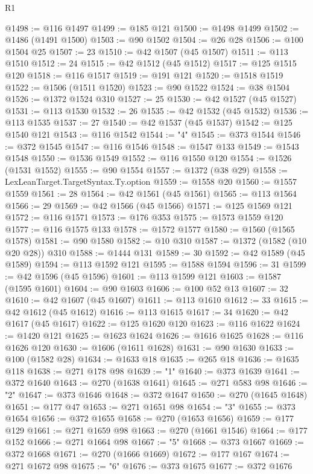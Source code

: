 \begin{lexlean}{R1}
\begin{coremodule}
@1498 := @116 @1497
@1499 := @185 @121
@1500 := @1498 @1499
@1502 := @1486 (@1491 @1500)
@1503 := @90 @1502
@1504 := @26 @28
@1506 := @100 @1504 @25
@1507 := 23
@1510 := @42 @1507 (@45 @1507)
@1511 := @113 @1510
@1512 := 24
@1515 := @42 @1512 (@45 @1512)
@1517 := @125 @1515 @120
@1518 := @116 @1517
@1519 := @191 @121
@1520 := @1518 @1519
@1522 := @1506 (@1511 @1520)
@1523 := @90 @1522
@1524 := @38 @1504
@1526 := @1372 @1524 @310
@1527 := 25
@1530 := @42 @1527 (@45 @1527)
@1531 := @113 @1530
@1532 := 26
@1535 := @42 @1532 (@45 @1532)
@1536 := @113 @1535
@1537 := 27
@1540 := @42 @1537 (@45 @1537)
@1542 := @125 @1540 @121
@1543 := @116 @1542
@1544 := "4"
@1545 := @373 @1544
@1546 := @372 @1545
@1547 := @116 @1546
@1548 := @1547 @133
@1549 := @1543 @1548
@1550 := @1536 @1549
@1552 := @116 @1550 @120
@1554 := @1526 (@1531 @1552)
@1555 := @90 @1554
@1557 := @1372 (@38 @29)
@1558 := LexLeanTarget.TargetSyntax.Ty.option
@1559 := @1558 @20
@1560 := @1557 @1559
@1561 := 28
@1564 := @42 @1561 (@45 @1561)
@1565 := @113 @1564
@1566 := 29
@1569 := @42 @1566 (@45 @1566)
@1571 := @125 @1569 @121
@1572 := @116 @1571
@1573 := @176 @353
@1575 := @1573 @1559 @120
@1577 := @116 @1575 @133
@1578 := @1572 @1577
@1580 := @1560 (@1565 @1578)
@1581 := @90 @1580
@1582 := @10 @310
@1587 := @1372 (@1582 (@10 @20 @28)) @310
@1588 := @1444 @131
@1589 := 30
@1592 := @42 @1589 (@45 @1589)
@1594 := @113 @1592 @121
@1595 := @1588 @1594
@1596 := 31
@1599 := @42 @1596 (@45 @1596)
@1601 := @113 @1599 @121
@1603 := @1587 (@1595 @1601)
@1604 := @90 @1603
@1606 := @100 @52 @13
@1607 := 32
@1610 := @42 @1607 (@45 @1607)
@1611 := @113 @1610
@1612 := 33
@1615 := @42 @1612 (@45 @1612)
@1616 := @113 @1615
@1617 := 34
@1620 := @42 @1617 (@45 @1617)
@1622 := @125 @1620 @120
@1623 := @116 @1622
@1624 := @1420 @121
@1625 := @1623 @1624
@1626 := @1616 @1625
@1628 := @116 @1626 @120
@1630 := @1606 (@1611 @1628)
@1631 := @90 @1630
@1633 := @100 (@1582 @28)
@1634 := @1633 @18
@1635 := @265 @18
@1636 := @1635 @118
@1638 := @271 @178 @98
@1639 := "1"
@1640 := @373 @1639
@1641 := @372 @1640
@1643 := @270 (@1638 @1641)
@1645 := @271 @583 @98
@1646 := "2"
@1647 := @373 @1646
@1648 := @372 @1647
@1650 := @270 (@1645 @1648)
@1651 := @177 @47
@1653 := @271 @1651 @98
@1654 := "3"
@1655 := @373 @1654
@1656 := @372 @1655
@1658 := @270 (@1653 @1656)
@1659 := @177 @129
@1661 := @271 @1659 @98
@1663 := @270 (@1661 @1546)
@1664 := @177 @152
@1666 := @271 @1664 @98
@1667 := "5"
@1668 := @373 @1667
@1669 := @372 @1668
@1671 := @270 (@1666 @1669)
@1672 := @177 @167
@1674 := @271 @1672 @98
@1675 := "6"
@1676 := @373 @1675
@1677 := @372 @1676

\end{coremodule}
\end{lexlean}
